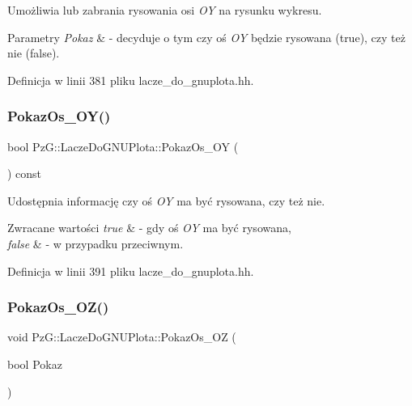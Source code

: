Umożliwia lub zabrania rysowania osi {\itshape OY} na rysunku wykresu. 
\begin{DoxyParams}{Parametry}
{\em Pokaz} & -\/ decyduje o tym czy oś {\itshape OY} będzie rysowana ({\ttfamily true}), czy też nie ({\ttfamily false}). \\
\hline
\end{DoxyParams}


Definicja w linii 381 pliku lacze\+\_\+do\+\_\+gnuplota.\+hh.

\mbox{\label{class_pz_g_1_1_lacze_do_g_n_u_plota_a7298f469f6932f5c808dcf620650b4b8}} 
\subsubsection{\texorpdfstring{PokazOs\_OY()}{PokazOs\_OY()}\hspace{0.1cm}{\footnotesize\ttfamily [2/2]}}
{\footnotesize\ttfamily bool Pz\+G\+::\+Lacze\+Do\+G\+N\+U\+Plota\+::\+Pokaz\+Os\+\_\+\+OY (\begin{DoxyParamCaption}{ }\end{DoxyParamCaption}) const\hspace{0.3cm}{\ttfamily [inline]}}

Udostępnia informację czy oś {\itshape OY} ma być rysowana, czy też nie. 
\begin{DoxyRetVals}{Zwracane wartości}
{\em true} & -\/ gdy oś {\itshape OY} ma być rysowana, \\
\hline
{\em false} & -\/ w przypadku przeciwnym. \\
\hline
\end{DoxyRetVals}


Definicja w linii 391 pliku lacze\+\_\+do\+\_\+gnuplota.\+hh.

\mbox{\label{class_pz_g_1_1_lacze_do_g_n_u_plota_a9fabfe88cb1801a5de8923f45f514b99}} 
\subsubsection{\texorpdfstring{PokazOs\_OZ()}{PokazOs\_OZ()}\hspace{0.1cm}{\footnotesize\ttfamily [1/2]}}
{\footnotesize\ttfamily void Pz\+G\+::\+Lacze\+Do\+G\+N\+U\+Plota\+::\+Pokaz\+Os\+\_\+\+OZ (\begin{DoxyParamCaption}\item[{bool}]{Pokaz }\end{DoxyParamCaption})\hspace{0.3cm}{\ttfamily [inline]}}

